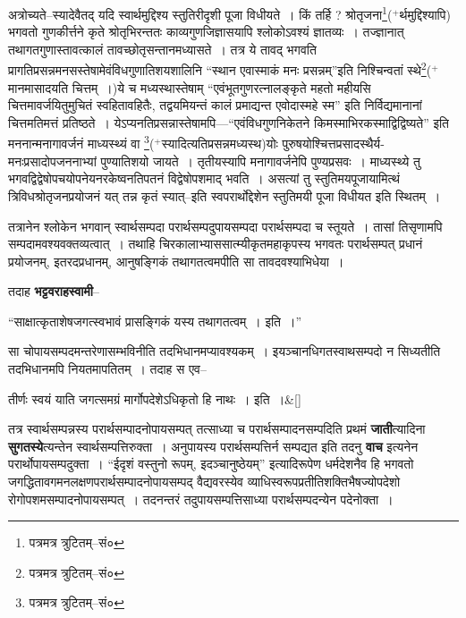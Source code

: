 \documentclass[article,12pt,a4paper]{memoir}
\newcommand{\add}[1]{($^{+}$#1)}
\begin{document}
	  \pstart अत्रोच्यते--स्यादेवैतद् यदि स्वार्थमुद्दिश्य स्तुतिरीदृशी पूजा विधीयते । किं तर्हि ? श्रोतृजना\footnote{पत्रमत्र त्रुटितम्--सं०}\add{र्थमुद्दिश्यापि} भगवतो गुणकीर्त्तने कृते श्रोतृभिरन्ततः काव्यगुणजिज्ञासयापि श्लोकोऽवश्यं ज्ञातव्यः । तज्ज्ञानात् तथागतगुणास्तावत्कालं तावच्छोतृसन्तानमध्यासते । तत्र ये तावद् भगवति प्रागतिप्रसन्नमनसस्तेषामेवंविधगुणातिशयशालिनि “स्थान एवास्माकं मनः प्रसन्नम्”इति निश्चिन्वतां स्थे\footnote{पत्रमत्र त्रुटितम्--सं०}\add{मानमासादयति चित्तम् ।}ये च मध्यस्थास्तेषाम् “एवंभूतगुणरत्नालङ्कृते महतो महीयसि चित्तमावर्जयितुमुचितं स्वहितावहितैः, तद्वयमियन्तं कालं प्रमाद्यन्त एवोदास्महे स्म” इति निर्विद्यमानानां चित्तमतिमत्तं प्रतिष्ठते । येऽप्यनतिप्रसन्नास्तेषामपि—“एवंविधगुणनिकेतने किमस्माभिरकस्माद्विद्विष्यते” इति मननान्मनागावर्जनं माध्यस्थ्यं वा \footnote{पत्रमत्र त्रुटितम्--सं०}\add{स्यादित्यतिप्रसन्नमध्यस्थ}योः पुरुषयोश्चित्तप्रसादस्थैर्य-मनःप्रसादोपजननाभ्यां पुण्यातिशयो जायते । तृतीयस्यापि मनागावर्जनेपि पुण्यप्रसवः । माध्यस्थ्ये तु भगवद्विद्वेषोपचयोपनेयनरकेष्वनतिपतनं विद्वेषोपशमाद् भवति । असत्यां तु स्तुतिमयपूजायामित्थं त्रिविधश्रोतृजनप्रयोजनं यत् तन्न कृतं स्यात्--इति स्वपरार्थो\leavevmode{}द्देशेन स्तुतिमयी पूजा विधीयत इति स्थितम् ।
	\pend
      

	  \pstart तत्रानेन श्लोकेन भगवान् स्वार्थसम्पदा परार्थसम्पदुपायसम्पदा परार्थसम्पदा च स्तूयते । तासां तिसृणामपि सम्पदामवश्यवक्तव्यत्वात् । तथाहि चिरकालाभ्याससात्म्यीकृतमहाकृपस्य भगवतः परार्थसम्पत् प्रधानं प्रयोजनम्, इतरदप्रधानम्, आनुषङ्गिकं तथागतत्वमपीति सा तावदवश्याभिधेया ।
	\pend
      

	  \pstart तदाह \textbf{भट्टवराहस्वामी}--
	\pend
      

	  \pstart “साक्षात्कृताशेषजगत्स्वभावं प्रासङ्गिकं यस्य तथागतत्वम् । इति ।”
	\pend
      

	  \pstart सा चोपायसम्पदमन्तरेणासम्भविनीति तदभिधानमप्यावश्यकम् । इयञ्चानधिगतस्वाथसम्पदो न सिध्यतीति तदभिधानमपि नियतमापतितम् । तदाह स एव--
	\pend
      
	  \bigskip
	  \begingroup
	
	    
	    \stanza[\smallbreak]
	तीर्णः स्वयं याति जगत्समग्रं मार्गोपदेशेऽधिकृतो हि नाथः । इति ।\&[\smallbreak]


	
	  \endgroup
	

	  \pstart तत्र स्वार्थसम्पन्नस्य परार्थसम्पादनोपायसम्पत् तत्साध्या च परार्थसम्पादनसम्पदिति प्रथमं \textbf{जाती}त्यादिना \textbf{सुगतस्ये}त्यन्तेन स्वार्थसम्पत्तिरुक्ता । अनुपायस्य परार्थसम्पत्तिर्न सम्पद्यत \leavevmode{} इति तदनु \textbf{वाच} इत्यनेन परार्थोपायसम्पदुक्ता । “ईदृशं वस्तुनो रूपम्, इदञ्चानुष्ठेयम्” इत्यादिरूपेण धर्मदेशनैव हि भगवतो जगद्धितावगमनलक्षणपरार्थसम्पादनोपायसम्पद् वैद्यवरस्येव व्याधिस्वरूपप्रतीतिशक्तिभैषज्योपदेशो रोगोपशमसम्पादनोपायसम्पत् । तदनन्तरं तदुपायसम्पत्तिसाध्या परार्थसम्पदन्येन पदेनोक्ता ।
	\pend
      
\end{document}
